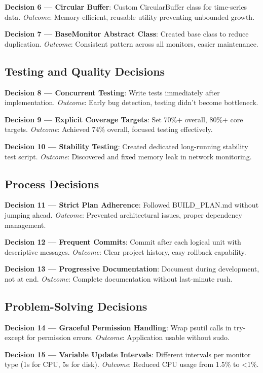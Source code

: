\documentclass[12pt,a4paper,oneside]{report}
\begin{document}
\textbf{Decision 6 --- Circular Buffer}: Custom CircularBuffer class for time-series data. \textit{Outcome}: Memory-efficient, reusable utility preventing unbounded growth.

\textbf{Decision 7 --- BaseMonitor Abstract Class}: Created base class to reduce duplication. \textit{Outcome}: Consistent pattern across all monitors, easier maintenance.

\subsection{Testing and Quality Decisions}

\textbf{Decision 8 --- Concurrent Testing}: Write tests immediately after implementation. \textit{Outcome}: Early bug detection, testing didn't become bottleneck.

\textbf{Decision 9 --- Explicit Coverage Targets}: Set 70\%+ overall, 80\%+ core targets. \textit{Outcome}: Achieved 74\% overall, focused testing effectively.

\textbf{Decision 10 --- Stability Testing}: Created dedicated long-running stability test script. \textit{Outcome}: Discovered and fixed memory leak in network monitoring.

\subsection{Process Decisions}

\textbf{Decision 11 --- Strict Plan Adherence}: Followed BUILD\_PLAN.md without jumping ahead. \textit{Outcome}: Prevented architectural issues, proper dependency management.

\textbf{Decision 12 --- Frequent Commits}: Commit after each logical unit with descriptive messages. \textit{Outcome}: Clear project history, easy rollback capability.

\textbf{Decision 13 --- Progressive Documentation}: Document during development, not at end. \textit{Outcome}: Complete documentation without last-minute rush.

\subsection{Problem-Solving Decisions}

\textbf{Decision 14 --- Graceful Permission Handling}: Wrap psutil calls in try-except for permission errors. \textit{Outcome}: Application usable without sudo.

\textbf{Decision 15 --- Variable Update Intervals}: Different intervals per monitor type (1s for CPU, 5s for disk). \textit{Outcome}: Reduced CPU usage from 1.5\% to <1\%.
\end{document}
